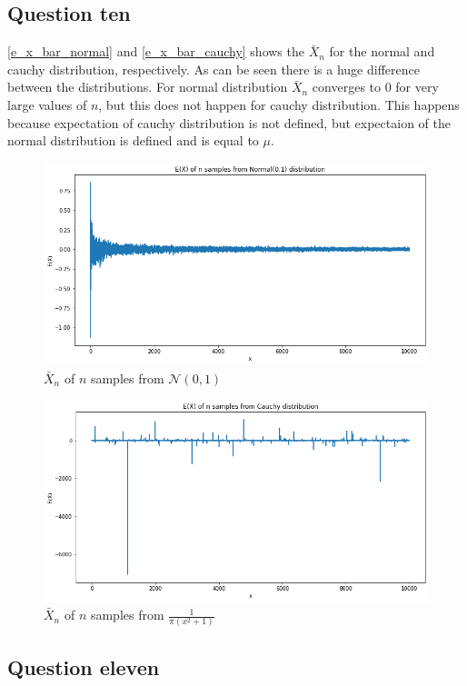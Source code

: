 \documentclass[12pt, a4paper]{book}
\begin{document}
\subsection*{Question ten}

\autoref{e_x_bar_normal} and \autoref{e_x_bar_cauchy} shows the $\bar{X}_n$ for the normal and cauchy distribution, respectively.
As can be seen there is a huge difference between the distributions. For normal distribution $\bar{X}_n$ converges to
$0$ for very large values of $n$, but this does not happen for cauchy distribution. This happens because
expectation of cauchy distribution is not defined, but expectaion of the normal distribution is defined and is equal to
$\mu$.

\begin{figure}[h]
    \centering
    \includegraphics[width=0.8\linewidth]{images/question10/normal.png}
    \caption{$\bar{X}_n$ of $n$ samples from $\mathcal{N}(0,1)$}
    \label{e_x_bar_normal}
\end{figure}

\begin{figure}[h]
    \centering
    \includegraphics[width=0.8\linewidth]{images/question10/cauchy.png}
    \caption{$\bar{X}_n$ of $n$ samples from $\frac{1}{\pi(x^2+1)}$}
    \label{e_x_bar_cauchy}
\end{figure}

\clearpage

\subsection*{Question eleven}
\end{document}
